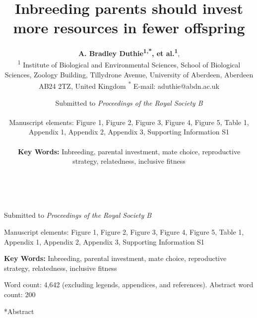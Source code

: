 \documentclass[12pt]{article}
\title{Inbreeding parents should invest more resources in fewer offspring}
\author{{\bf A. Bradley Duthie\textsuperscript{1,*}, et al.\textsuperscript{1}}, \\ {\footnotesize \textsuperscript{1} Institute of Biological and Environmental Sciences, School of Biological Sciences, Zoology Building, Tillydrone Avenue, University of Aberdeen, Aberdeen AB24 2TZ, United Kingdom \textsuperscript{*} E-mail: aduthie@abdn.ac.uk}}
\author{Submitted to \emph{Proceedings of the Royal Society B} \\ \\ Manuscript elements: Figure 1, Figure 2, Figure 3, Figure 4, Figure 5, Table 1, Appendix 1, Appendix 2, Appendix 3, Supporting Information S1\\ \\ \textbf{Key Words:} Inbreeding, parental investment, mate choice, reproductive strategy, relatedness, inclusive fitness}
\author{}
\date{}
\makeatletter
\renewcommand\section{\@startsection{section}{1}{0in}{-0.5\baselineskip}{0.1\baselineskip}{\normalfont\large\bfseries}}
\makeatother
\begin{document}
\maketitle

\begin{center}
\vspace{5 mm}

 \\ 

\vspace{5 mm}


\vspace{15 mm}

\noindent Submitted to \emph{Proceedings of the Royal Society B}  \\ 

\vspace{15 mm} 

\noindent Manuscript elements: Figure 1, Figure 2, Figure 3, Figure 4, Figure 5, Table 1, Appendix 1, Appendix 2, Appendix 3, Supporting Information S1 \\ 

\vspace{15 mm}

\noindent \textbf{Key Words:} Inbreeding, parental investment, mate choice, reproductive strategy, relatedness, inclusive fitness
\newline

\vspace{15 mm}
\noindent Word count: 4,642 (excluding legends, appendices, and references). Abstract word count: 200

\end{center}

\linenumbers
\modulolinenumbers[2]
\doublespacing

\clearpage

\section*{Abstract} 
\end{document}
